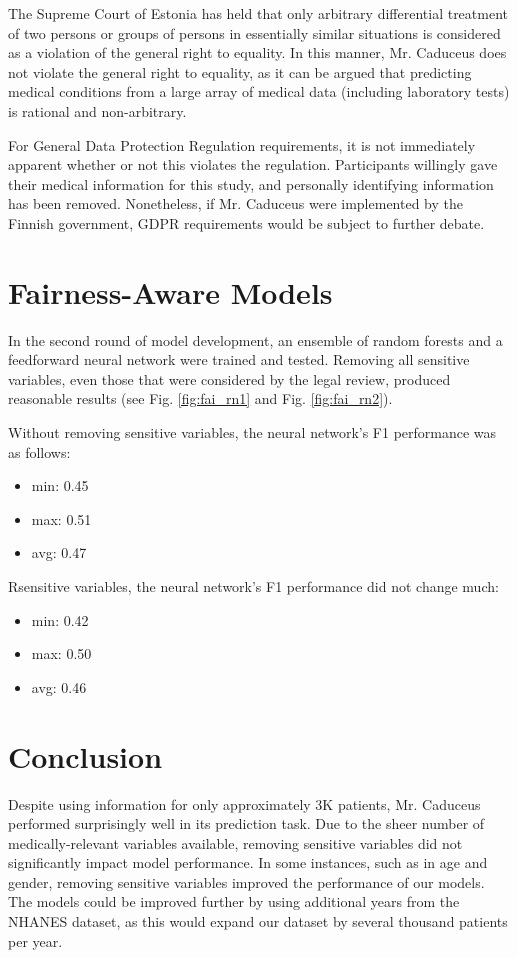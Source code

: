 \documentclass[runningheads]{llncs}
\begin{document}
The Supreme Court of Estonia has held that only arbitrary differential treatment of two persons or groups of persons in essentially similar situations is considered as a violation of the general right to equality. In this manner, Mr. Caduceus does not violate the general right to equality, as it can be argued that predicting medical conditions from a large array of medical data (including laboratory tests) is rational and non-arbitrary.

For General Data Protection Regulation requirements, it is not immediately apparent whether or not this violates the regulation. Participants willingly gave their medical information for this study, and personally identifying information has been removed. Nonetheless, if Mr. Caduceus were implemented by the Finnish government, GDPR requirements would be subject to further debate.

\section{Fairness-Aware Models}
In the second round of model development, an ensemble of random forests and a feedforward neural network were trained and tested. Removing all sensitive variables, even those that were considered  by the legal review, produced reasonable results (see Fig. \ref{fig:fai_rn1} and Fig. \ref{fig:fai_rn2}). 

Without removing sensitive variables, the neural network's F1 performance was as follows:
\begin{itemize}
\item min: 0.45
\item max: 0.51
\item avg:  0.47
\end{itemize}

Rsensitive variables, the neural network's F1 performance did not change much:
\begin{itemize}
\item min: 0.42
\item max: 0.50
\item avg: 0.46
\end{itemize}

\section{Conclusion}
Despite using information for only approximately 3K patients, Mr. Caduceus performed surprisingly well in its prediction task. Due to the sheer number of medically-relevant variables available, removing sensitive variables did not significantly impact model performance. In some instances, such as in age and gender, removing sensitive variables improved the performance of our models. The models could be improved further by using additional years from the NHANES dataset, as this would expand our dataset by several thousand patients per year. 
\end{document}
